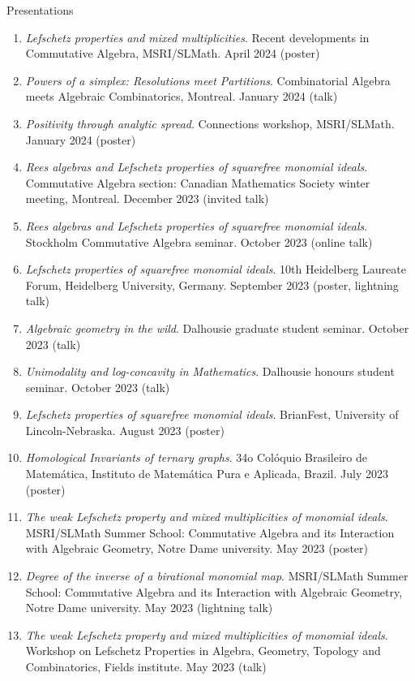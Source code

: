 \documentclass[12pt]{resume} %
\begin{document}
\begin{rSection}{Presentations}
    \begin{enumerate}
        \item \textit{Lefschetz properties and mixed multiplicities}. Recent developments in Commutative Algebra, MSRI/SLMath. April 2024 (poster)
        \item \textit{Powers of a simplex: Resolutions meet Partitions}. Combinatorial Algebra meets Algebraic Combinatorics, Montreal. January 2024 (talk)
        \item \textit{Positivity through analytic spread}. Connections workshop, MSRI/SLMath. January 2024 (poster)
        \item \textit{Rees algebras and Lefschetz properties of squarefree monomial ideals}. Commutative Algebra section: Canadian Mathematics Society winter meeting, Montreal. December 2023 (invited talk)
        \item \textit{Rees algebras and Lefschetz properties of squarefree monomial ideals}. Stockholm Commutative Algebra seminar. October 2023 (online talk)
        \item \textit{Lefschetz properties of squarefree monomial ideals}. 10th Heidelberg Laureate Forum, Heidelberg University, Germany. September 2023 (poster, lightning talk)
        \item \textit{Algebraic geometry in the wild}. Dalhousie graduate student seminar. October 2023 (talk)
        \item \textit{Unimodality and log-concavity in Mathematics}. Dalhousie honours student seminar. October 2023 (talk)
        \item \textit{Lefschetz properties of squarefree monomial ideals}. BrianFest, University of Lincoln-Nebraska. August 2023 (poster)
        \item \textit{Homological Invariants of ternary graphs}. 34o Colóquio Brasileiro de Matemática, Instituto de Matemática Pura e Aplicada, Brazil. July 2023 (poster)
        \item \textit{The weak Lefschetz property and mixed multiplicities of monomial ideals}. MSRI/SLMath Summer School: Commutative Algebra and its Interaction with Algebraic Geometry, Notre Dame university. May 2023 (poster)
        \item \textit{Degree of the inverse of a birational monomial map}. MSRI/SLMath Summer School: Commutative Algebra and its Interaction with Algebraic Geometry, Notre Dame university. May 2023 (lightning talk)
        \item \textit{The weak Lefschetz property and mixed multiplicities of monomial ideals}. Workshop on Lefschetz Properties in Algebra, Geometry, Topology and Combinatorics, Fields institute. May 2023 (talk)

\end{enumerate}
\end{rSection}
\end{document}
